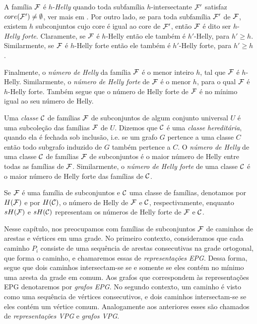 A família $\cal{F}$ é $h$-{\it Helly} quando toda subfamília $h$-intersectante $\cal{F'}$ satisfaz $core(\cal{F'}) \neq \emptyset$, ver mais em \cite{duchet1978propriete}. Por outro lado, se para toda subfamília $\cal{F'}$ de $\cal{F}$, existem $h$ subconjuntos cujo core é igual ao core de  $\cal {F'}$, então $\cal {F}$ é dito ser  $h$-{\it Helly} {\it forte}. Claramente, se $\cal {F}$ é $h$-Helly então ele também é $h'$-Helly, para $h' \geq h$. Similarmente, se ${\cal F}$ é $h$-Helly forte então ele também é $h'$-Helly forte, para $h' \geq h$. 

Finalmente, o   {\it número de Helly} da família  $\cal{F}$ é o menor inteiro $h$, tal que $\cal{F}$ é  $h$-Helly. Similarmente, o {\it número de Helly forte} de  $\cal{F}$ é o menor $h$, para o qual  $\cal{F}$ é  $h$-Helly forte. Também segue que o número de Helly forte de $\cal{F}$ é no mínimo igual ao seu número de Helly.


Uma  {\it classe} $\cal {C}$ de famílias $\cal {F}$  de subconjuntos de algum conjunto universal $U$ é uma  subcoleção das famílias $\cal {F}$ de $U$. Dizemos que  $\cal C$ é uma {\it classe hereditária}, quando ela é fechada sob inclusão, i.e. se um grafo $G$ pertence a uma classe $C$ então todo subgrafo induzido de $G$ também pertence a $C$. O {\it número de Helly}  de uma classe  $\cal{C}$ de famílias $\cal{F}$ de subconjuntos é o maior número de Helly entre todas as famílias de $\cal {F}$. Similarmente, o {\it número de Helly forte} de uma classe  $\cal {C}$ é o maior número de Helly forte das famílias de $\cal {C}$.

Se $\cal F$ é uma família de subconjuntos e $\cal C$ uma classe de famílias, denotamos por $H(\cal F)$ e por 
$H(\cal C)$,  o número de  Helly de $\cal F$ e $\cal C$, respectivamente, enquanto  $sH({\cal F})$ e $sH({\cal C})$  representam os números de  Helly forte de $\cal F$ e $\cal C$.


Nesse capítulo, nos preocupamos com famílias de subconjuntos $\cal{F}$ de caminhos de arestas e vértices em uma grade. No primeiro contexto, consideramos que cada caminho $P_i$  consiste de uma sequência de arestas consecutivas na grade ortogonal, que forma o caminho, e chamaremos essas de   {\it representações EPG}. Dessa forma, segue que dois caminhos intersectam-se se e somente se eles contém no mínimo uma aresta da grade em comum. Aos grafos que  correspondem às representações EPG denotaremos por {\it grafos EPG}. 
No segundo contexto, um caminho é visto como uma sequência de vértices consecutivos, e dois caminhos intersectam-se se eles contém um vértice comum. Analogamente aos anteriores esses são chamados de {\it representações VPG} e {\it grafos VPG}. 

